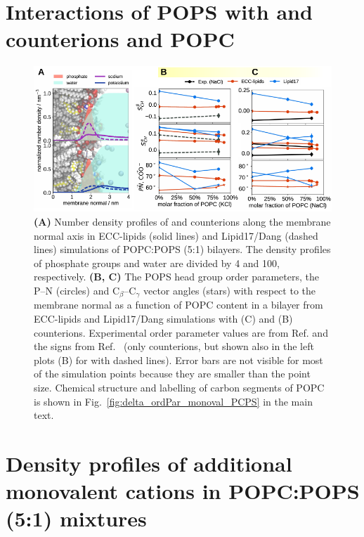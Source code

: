 \documentclass[journal=jctcce,manuscript=article]{achemso}
\newlength{\figwidth}
\newlength{\figwidthfull}
\begin{document}
\pagebreak
\section{Interactions of POPS with  and  counterions and POPC}

\begin{figure}[!h] 
  \centering 
  \includegraphics[width=\figwidthfull]{../img/deltaOP_mix_PC-PS_SupplInf-POPS-OP.pdf} 
  \caption{\label{fig:delta_ordPar_NaCl_PC-PS_mix_PS} 
    \textbf{(A)} Number density profiles of  and  counterions along the membrane normal axis
    in ECC-lipids (solid lines) and Lipid17/Dang (dashed lines) simulations of POPC:POPS (5:1) bilayers.  
    The density profiles of phosphate groups and water are divided by 4 and 100, respectively.  
    \textbf{(B, C)} The POPS head group order parameters, the P--N (circles) and C$_\beta$--C$_\gamma$ vector angles (stars) 
    with respect to the membrane normal as a function of POPC content in a bilayer
    from ECC-lipids and Lipid17/Dang simulations with  (C) and  (B) counterions.
    Experimental order parameter values are from Ref. 
    and the signs from Ref.~ 
    (only  counterions, but shown also in the left plots (B) for  with dashed lines).
    Error bars are not visible for most of the simulation points because they are smaller than the point size.
    Chemical structure and labelling of carbon segments of POPC is shown in Fig.~\ref{fig:delta_ordPar_monoval_PCPS} in the main text. 
  }
\end{figure} 



\pagebreak

\section{Density profiles of additional monovalent cations in POPC:POPS (5:1) mixtures}
\end{document}
